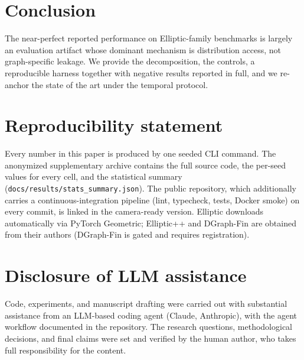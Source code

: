 \documentclass[10pt]{article}
\begin{document}
\section{Conclusion}
The near-perfect reported performance on Elliptic-family benchmarks is largely an
evaluation artifact whose dominant mechanism is distribution access, not
graph-specific leakage. We provide the decomposition, the controls, a reproducible
harness together with negative results reported in full, and we re-anchor the
state of the art under the temporal protocol.

\section*{Reproducibility statement}
Every number in this paper is produced by one seeded CLI command. The
anonymized supplementary archive contains the full source code, the per-seed
values for every cell, and the statistical summary
(\texttt{docs/results/stats\_summary.json}). The public repository, which
additionally carries a continuous-integration pipeline (lint, typecheck, tests,
Docker smoke) on every commit, is linked in the camera-ready version.
Elliptic downloads automatically via PyTorch Geometric; Elliptic++ and DGraph-Fin
are obtained from their authors (DGraph-Fin is gated and requires registration).

\section*{Disclosure of LLM assistance}
Code, experiments, and manuscript drafting were carried out with substantial
assistance from an LLM-based coding agent (Claude, Anthropic), with the agent
workflow documented in the repository. The research questions, methodological
decisions, and final claims were set and verified by the human author, who takes
full responsibility for the content.



\end{document}
